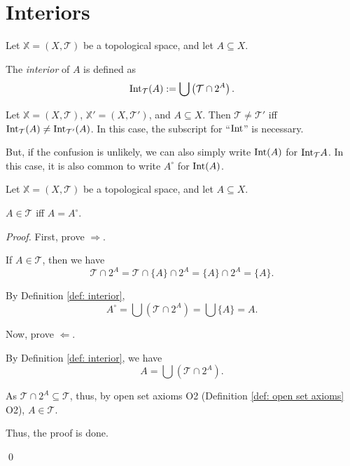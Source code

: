 \section{Interiors}


\begin{definition}
	\label{def: interior}
	Let $\mathbb X = (X, \mathcal T)$ be a topological space, and let $A \subseteq X$.
	
	The \textit{interior} of $A$ is defined as
	$$
	\mathrm{Int}_{\mathcal T}(A) := \bigcup \left(\mathcal T \cap 2^A \right).
	$$
\end{definition}


\begin{note}
	Let $\mathbb X = (X, \mathcal T)$, $\mathbb X' = (X, \mathcal T')$, and $A \subseteq X$. Then $\mathcal T \ne \mathcal T'$ iff $\mathrm{Int}_{\mathcal T}(A) \ne \mathrm{Int}_{\mathcal T'}(A)$. In this case, the subscript for ``$\mathrm{Int}$'' is necessary.
	
	But, if the confusion is unlikely, we can also simply write $\mathrm{Int} (A)$ for $\mathrm{Int}_\mathcal T A$. In this case, it is also common to write $A^\circ$ for $\mathrm{Int}(A)$.
\end{note}


\begin{theorem}
	Let $\mathbb X = (X, \mathcal T)$ be a topological space, and let $A \subseteq X$.
	
	$A \in \mathcal T$ iff $A = A^\circ$.
	
	\begin{proof}
		First, prove $\Rightarrow$.
		
		If $A \in \mathcal T$, then we have
		$$
		\mathcal T \cap 2^A = \mathcal T \cap \{A\} \cap 2^A = \{A\} \cap 2^A = \{A\}.
		$$
		
		By Definition \ref{def: interior},
		$$
		A^\circ = \bigcup(\mathcal T \cap 2^A) = \bigcup\{A\} = A.
		$$
		
		\qedlm
		
		Now, prove $\Leftarrow$.
		
		By Definition \ref{def: interior}, we have
		$$
		A = \bigcup(\mathcal T \cap 2^A).
		$$
		
		As $\mathcal T \cap 2^A \subseteq \mathcal T$, thus, by open set axioms O2 (Definition \ref{def: open set axioms} O2), $A \in \mathcal T$.
		
		\qedlm
		
		Thus, the proof is done.
		
		\qed
	\end{proof}
\end{theorem}


